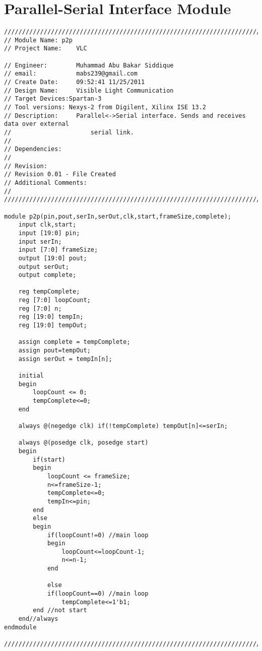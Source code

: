 \section{Parallel-Serial Interface Module}
\label{sec:p2p}
\begin{lstlisting}[style=verilog-style,basicstyle=\tiny]
//////////////////////////////////////////////////////////////////////////////////
// Module Name:	p2p
// Project Name: 	VLC

// Engineer: 		Muhammad Abu Bakar Siddique
// email:			mabs239@gmail.com
// Create Date:  	09:52:41 11/25/2011 
// Design Name: 	Visible Light Communication
// Target Devices:Spartan-3 
// Tool versions: Nexys-2 from Digilent, Xilinx ISE 13.2
// Description: 	Parallel<->Serial interface. Sends and receives data over external 
//						serial link.
//
// Dependencies: 	
//
// Revision: 
// Revision 0.01 - File Created
// Additional Comments: 
//
//////////////////////////////////////////////////////////////////////////////////

module p2p(pin,pout,serIn,serOut,clk,start,frameSize,complete);
	input clk,start;
	input [19:0] pin;
	input serIn;
	input [7:0] frameSize;
	output [19:0] pout; 
	output serOut;
	output complete;
	
	reg tempComplete;
	reg [7:0] loopCount;	
	reg [7:0] n;
	reg [19:0] tempIn;
	reg [19:0] tempOut;
	
	assign complete = tempComplete;
	assign pout=tempOut;
	assign serOut = tempIn[n];
	
	initial
	begin
		loopCount <= 0;
		tempComplete<=0;
	end

	always @(negedge clk) if(!tempComplete) tempOut[n]<=serIn;
	
	always @(posedge clk, posedge start)  
	begin
		if(start)
		begin
			loopCount <= frameSize;
			n<=frameSize-1;
			tempComplete<=0;
			tempIn<=pin;
		end
		else 
		begin
			if(loopCount!=0) //main loop
			begin
				loopCount<=loopCount-1;
				n<=n-1;
			end
			
			else
			if(loopCount==0) //main loop
				tempComplete<=1'b1;
		end //not start
	end//always
endmodule

//////////////////////////////////////////////////////////////////////////////////
\end{lstlisting}

\newpage

